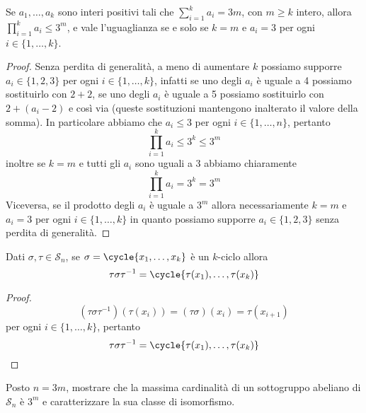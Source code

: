 \documentclass[11pt]{scrartcl}
\begin{document}
\begin{lemma}
    \label{lemma1.55}
    Se $a_1, \ldots, a_k$ sono interi positivi tali che $\displaystyle
    \sum_{i = 1}^k a_i = 3m$,
    con $m \geqslant k$ intero, allora $\displaystyle
        \prod_{i = 1}^k a_i \leq 3^m$, 
        e vale l'uguaglianza se e solo se $k = m$ e $a_i = 3$ per ogni $i \in \{1, \ldots, k\}$.
\end{lemma}

\begin{proof}
    Senza perdita di generalità, a meno di aumentare $k$ possiamo supporre
    $a_i \in \{1, 2, 3\}$ per ogni $i \in \{1, \ldots, k\}$, infatti se 
    uno degli $a_i$ è uguale a 4 possiamo sostituirlo con $2 + 2$, se uno degli
    $a_i$ è uguale a 5 possiamo sostituirlo con $2 + (a_i - 2)$ e così via
    (queste sostituzioni mantengono inalterato il valore della somma).
    In particolare abbiamo che $a_i \leqslant 3$ per ogni $i \in \{1, \ldots, n\}$,
    pertanto 
    \[
        \prod_{i = 1}^k a_i \leq 3^k \leq 3^m
    \]
    inoltre se $k = m$ e tutti gli $a_i$ sono uguali a 3 abbiamo chiaramente
    \[
        \prod_{i = 1}^k a_i = 3^k = 3^m
    \]
    Viceversa, se il prodotto degli $a_i$ è uguale a $3^m$ allora necessariamente
    $k = m$ e $a_i = 3$ per ogni $i \in \{1, \ldots, k\}$ in quanto possiamo
    supporre $a_i \in \{1, 2, 3\}$ senza perdita di generalità.
\end{proof}

\begin{lemma}
    \label{lemma1.56}
    Dati $\sigma, \tau \in \mathcal{S}_n$, se $\sigma = \cycle{x_1, \ldots, x_k}$ è un 
    $k$-ciclo allora 
    \[
        \tau\sigma\tau^{-1} = \cycle{\tau(x_1),\ldots, \tau(x_k)}
    \]
\end{lemma}

\begin{proof}
    \[
        (\tau\sigma\tau^{-1})(\tau(x_i)) = (\tau\sigma)(x_i) = \tau(x_{i + 1})
    \]per ogni $i \in \{1, \ldots, k\}$, pertanto
    \[
        \tau\sigma\tau^{-1} = \cycle{\tau(x_1), \ldots, \tau(x_k)}
    \]
\end{proof}


\begin{exercise}
    Posto $n = 3m$, mostrare che la massima cardinalità di un sottogruppo
    abeliano di $\mathcal{S}_n$ è $3^m$ e caratterizzare la sua classe di isomorfismo.
\end{exercise}
\end{document}

